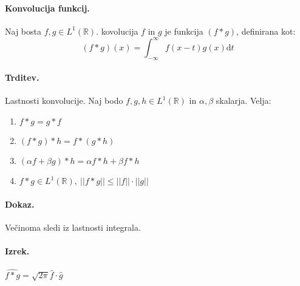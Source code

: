 \documentclass[a4paper]{article}
\newcommand{\dif}{\mathrm{d}}
\newcommand{\R}{\mathbb{R}}
\begin{document}
\paragraph{Konvolucija funkcij.} Naj bosta $f, g \in L^1(\R)$. kovolucija $f$ in $g$ je funkcija $(f*g)$, definirana kot:
$$(f*g)(x) = \int_{-\infty}^{\infty}f(x-t)g(x)\dif t$$
\paragraph{Trditev.} Lastnosti konvolucije. Naj bodo $f, g, h \in L^1(\R)$ in $\alpha, \beta$ skalarja. Velja:
\begin{enumerate}
    \item $f*g = g*f$
    \item $(f*g)*h = f*(g*h)$
    \item $(\alpha f + \beta g) * h = \alpha f * h + \beta f * h$
    \item $f * g \in L^1(\R),~||f * g|| \leq ||f||\cdot||g||$
\end{enumerate}
\paragraph{Dokaz.} Večinoma sledi iz lastnosti integrala.
\paragraph{Izrek.} $\displaystyle{\widehat{f * g} = \sqrt{2\pi}\hat{f}\cdot\hat{g}}$
\end{document}
